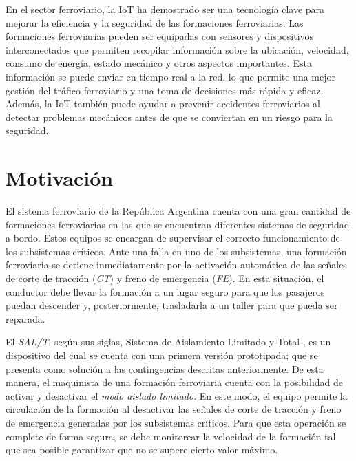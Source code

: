 En el sector ferroviario, la IoT ha demostrado ser una tecnología clave para mejorar la eficiencia y la seguridad de las formaciones ferroviarias. Las formaciones ferroviarias pueden ser equipadas con sensores y dispositivos interconectados que permiten recopilar información sobre la ubicación, velocidad, consumo de energía, estado mecánico y otros aspectos importantes. Esta información se puede enviar en tiempo real a la red, lo que permite una mejor gestión del tráfico ferroviario y una toma de decisiones más rápida y eficaz. Además, la IoT también puede ayudar a prevenir accidentes ferroviarios al detectar problemas mecánicos antes de que se conviertan en un riesgo para la seguridad.


%


\section{Motivación}

El sistema ferroviario de la República Argentina cuenta con una gran cantidad de formaciones ferroviarias en las que se encuentran diferentes sistemas de seguridad a bordo. Estos equipos se encargan de supervisar el correcto funcionamiento de los subsistemas críticos. Ante una falla en uno de los subsistemas, una formación ferroviaria se detiene inmediatamente por la activación automática de las señales de corte de tracción (\textit{CT}) y freno de emergencia (\textit{FE}). En esta situación, el conductor debe llevar la formación a un lugar seguro para que los pasajeros puedan descender y, posteriormente, trasladarla a un taller para que pueda ser reparada.

El \textit{SAL/T}, según sus siglas, Sistema de Aislamiento Limitado y Total \citep{salt-physical-paper}, es un dispositivo del cual se cuenta con una primera versión prototipada; que se presenta como solución a las contingencias descritas anteriormente. De esta manera, el maquinista de una formación ferroviaria cuenta con la posibilidad de activar y desactivar el \textit{modo aislado limitado}. En este modo, el equipo permite la circulación de la formación al desactivar las señales de corte de tracción y freno de emergencia generadas por los subsistemas críticos. Para que esta operación se complete de forma segura, se debe monitorear la velocidad de la formación tal que sea posible garantizar que no se supere cierto valor máximo.

